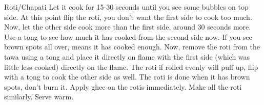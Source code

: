 \documentclass{article}
\renewcommand{\step} %
{%
 \stepcounter{step}%
    \lettrine
    [%
        lines=2,
        lhang=0,          %
        loversize=0.15,   %
        slope=0em,
        findent=1em,      %
        nindent=0em       %
    ]{\thestep}{}%
}
\begin{document}
\begin{recipe}[
preparationtime={\unit[15]{min} + \unit[20-30]{min} rest},
bakingtime={\unit[15]{min}},
portion={12 rotis},
source=\url{https://www.cookwithmanali.com/roti-recipe/}]{Roti/Chapati}
{\step Let it cook for 15-30 seconds until you see some bubbles on top side. At this point flip the roti, you don't want the first side to cook too much.
\step Now, let the other side cook more than the first side, around 30 seconds more. Use a tong to see how much it has cooked from the second side now. If you see brown spots all over, means it has cooked enough.
\step Now, remove the roti from the tawa using a tong and place it directly on flame with the first side (which was little less cooked) directly on the flame. The roti if rolled evenly will puff up, flip with a tong to cook the other side as well. The roti is done when it has brown spots, don't burn it.
\step Apply ghee on the rotis immediately. Make all the roti similarly. Serve warm.
}
\end{recipe}
\end{document}
